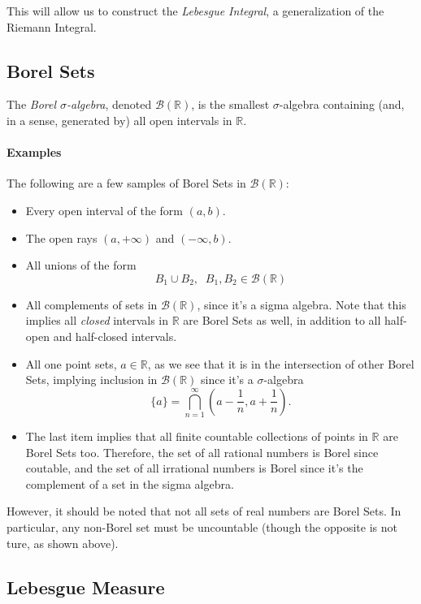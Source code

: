 \documentclass[12pt]{article}
\theoremstyle{plain}
\theoremstyle{definition}
\theoremstyle{remark}
\begin{document}
This will allow us to construct the \emph{Lebesgue Integral}, a generalization of the Riemann Integral.

\subsection{Borel Sets}

The \emph{Borel $\sigma$-algebra}, denoted $\mathcal{B}(\mathbb{R})$, is the smallest $\sigma$-algebra containing (and, in a sense,
generated by) all open intervals
in $\mathbb{R}$.

\paragraph{Examples} The following are a few samples of Borel Sets in $\mathcal{B}(\mathbb{R})$:
\begin{itemize}
   \item{Every open interval of the form $(a,b)$.}
   \item{The open rays $(a,+\infty)$ and $(-\infty,b)$.}
   \item{All unions of the form
	 \[ B_1 \cup B_2, \;\; B_1,B_2 \in \mathcal{B}(\mathbb{R}) \]
      }
   \item{All complements of sets in $\mathcal{B}(\mathbb{R})$, since it's a sigma algebra. Note that this implies all \emph{closed}
      intervals in $\mathbb{R}$ are Borel Sets as well, in addition to all half-open and half-closed intervals.}
   \item{All one point sets, $a\in\mathbb{R}$, as we see that it is in the intersection of other Borel Sets, implying inclusion in
	 $\mathcal{B}(\mathbb{R})$ since it's a $\sigma$-algebra
	 \[ \{a \} = \bigcap_{n=1}^{\infty} \left( a - \frac{1}{n}, a + \frac{1}{n} \right). \]
      }
   \item{The last item implies that all finite countable collections of points in $\mathbb{R}$ are Borel Sets too. Therefore, the set
      of all rational numbers is Borel since coutable, and the set of all irrational numbers is Borel since it's the complement of a
      set in the sigma algebra.}
\end{itemize}

However, it should be noted that not all sets of real numbers are Borel Sets.  In particular, any non-Borel set must be uncountable
(though the opposite is not ture, as shown above).

\subsection{Lebesgue Measure}
\end{document}
